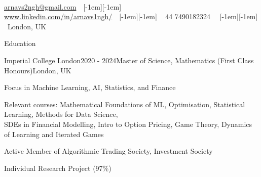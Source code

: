\documentclass{resume} %
\newcommand*\maintitle[2]{\noindent{\LARGE \textbf{#1}}\ \ \ \emph{#2}\vspace{0.3em}} %
\newcommand*\bull{\ \ \raisebox{-0.365em}[-1em][-1em]{\textscale{4}{$\cdot$}} \ } %
\begin{document}
\maintitle{Arnav Singh}{}  %

\noindent\href{mailto:arnavs2ngh@gmail.com}{arnavs2ngh@gmail.com}\bull %
\href{www.linkedin.com/in/arnavs1ngh/}{www.linkedin.com/in/arnavs1ngh/}\bull
\textsmaller{+}44 7490182324
 \bull London, UK %

\begin{rSection}{Education}
\begin{rSubsection}{Imperial College London}{2020 - 2024}{Master of Science, Mathematics (First Class Honours)}{London, UK}
\item Focus in Machine Learning, AI, Statistics, and Finance
\item Relevant courses: Mathematical Foundations of ML, Optimisation, Statistical Learning, Methods for Data Science,\\ SDEs in Financial Modelling, Intro to Option Pricing, Game Theory, Dynamics of Learning and Iterated Games
\item Active Member of Algorithmic Trading Society, Investment Society
\item Individual Research Project (97\%)
\vspace{-.65cm}
\item[]
\end{rSubsection}
\end{rSection}

\end{document}
